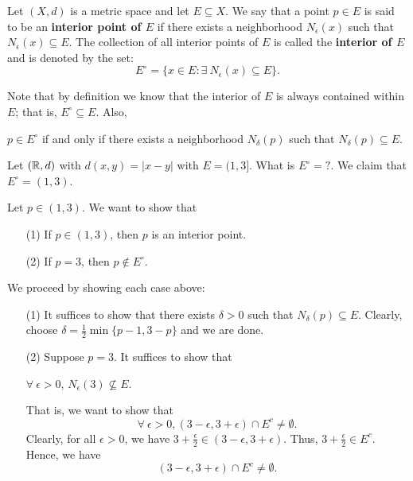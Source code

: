 \documentclass[a4paper]{report}
\begin{document}
\begin{definition}
   Let \( (X,d) \) is a metric space and let \( E \subseteq  X  \). We say that a point \( p \in E  \) is said to be an \textbf{interior point of \( E  \)} if there exists a neighborhood \( {N}_{\epsilon}(x)  \) such that \( {N}_{\epsilon}(x) \subseteq E  \). The collection of all interior points of \( E  \) is called the \textbf{interior of \( E  \)} and is denoted by the set:
   \[  E^{\circ} = \{ x \in E : \exists \ {N}_{\epsilon}(x) \subseteq E  \}. \]
\end{definition}

\begin{remark}
    Note that by definition we know that the interior of \( E  \) is always contained within \( E  \); that is, \( E^{\circ} \subseteq  E  \). Also, 
    \begin{center}
        \( p \in E^{\circ}  \) if and only if there exists a neighborhood \( {N}_{\delta}(p)  \) such that \( {N}_{\delta}(p) \subseteq E  \).
    \end{center}
\end{remark}

\begin{eg}
    Let \( (\mathbb{R}, d) \) with \( d(x,y) = | x - y  |  \) with \( E = (1,3] \). What is \( E^{\circ} = ?  \). We claim that \( E^{\circ} = (1,3) \).

    Let \( p \in  (1,3) \). We want to show that 
    \begin{enumerate}
        \item[(1)] If \( p \in (1,3) \), then \( p  \) is an interior point.
        \item[(2)] If \( p = 3  \), then \( p \notin E^{\circ} \).
    \end{enumerate}
    We proceed by showing each case above:
    \begin{enumerate}
        \item[(1)] It suffices to show that there exists \( \delta > 0  \) such that \( {N}_{\delta}(p) \subseteq  E  \). Clearly, choose \( \delta = \frac{ 1 }{ 2 }  \min \{  p - 1 , 3 - p \}  \) and we are done.
        \item[(2)] Suppose \( p = 3  \). It suffices to show that 
            \begin{center}
                \( \forall \ \epsilon > 0  \), \( {N}_{\epsilon}(3) \not\subseteq E  \).
            \end{center}
            That is, we want to show that
            \[  \forall \ \epsilon > 0 , (3 - \epsilon, 3 + \epsilon) \cap E^{c} \neq \emptyset. \]
            Clearly, for all \( \epsilon > 0  \), we have \( 3 + \frac{ \epsilon  }{  2  }  \in (3 - \epsilon , 3 + \epsilon) \). Thus, \( 3  + \frac{ \epsilon  }{  2  }  \in E^{c} \). Hence, we have 
            \[  (3 - \epsilon , 3 + \epsilon) \cap E^{c} \neq \emptyset. \]
    \end{enumerate}
\end{eg}
\end{document}
